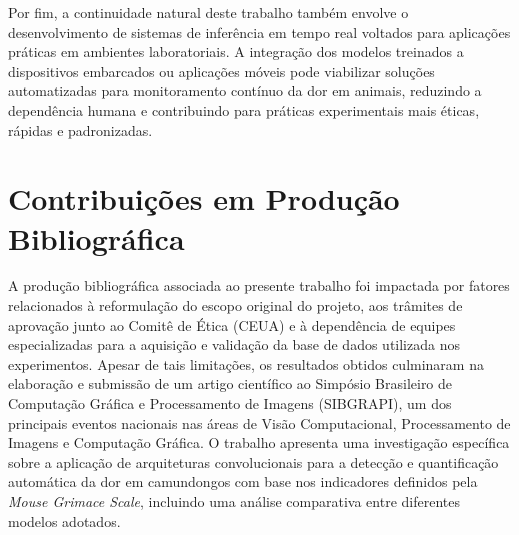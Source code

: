 Por fim, a continuidade natural deste trabalho também envolve o desenvolvimento de sistemas de inferência em tempo real voltados para aplicações práticas em ambientes laboratoriais. A integração dos modelos treinados a dispositivos embarcados ou aplicações móveis pode viabilizar soluções automatizadas para monitoramento contínuo da dor em animais, reduzindo a dependência humana e contribuindo para práticas experimentais mais éticas, rápidas e padronizadas.

\section{Contribuições em Produção Bibliográfica}



A produção bibliográfica associada ao presente trabalho foi impactada por fatores relacionados à reformulação do escopo original do projeto, aos trâmites de aprovação junto ao Comitê de Ética (\acs{CEUA}) e à dependência de equipes especializadas para a aquisição e validação da base de dados utilizada nos experimentos. Apesar de tais limitações, os resultados obtidos culminaram na elaboração e submissão de um artigo científico ao Simpósio Brasileiro de Computação Gráfica e Processamento de Imagens (\acs{SIBGRAPI}), um dos principais eventos nacionais nas áreas de Visão Computacional, Processamento de Imagens e Computação Gráfica. O trabalho apresenta uma investigação específica sobre a aplicação de arquiteturas convolucionais para a detecção e quantificação automática da dor em camundongos com base nos indicadores definidos pela \textit{Mouse Grimace Scale}, incluindo uma análise comparativa entre diferentes modelos adotados.

